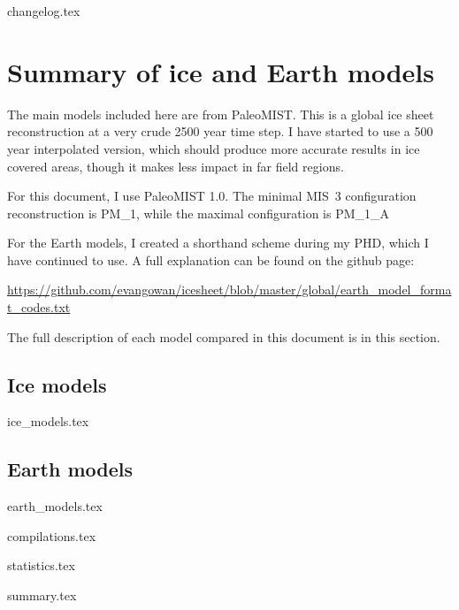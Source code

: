 \documentclass[a4paper,12pt]{article}
\begin{document}
{changelog.tex}

\section{Summary of ice and Earth models}


The main models included here are from PaleoMIST. This is a global ice sheet reconstruction at a very crude 2500 year time step. I have started to use a 500 year interpolated version, which should produce more accurate results in ice covered areas, though it makes less impact in far field regions.

For this document, I use PaleoMIST 1.0. The minimal MIS~3 configuration reconstruction is PM\_1, while the maximal configuration is PM\_1\_A

For the Earth models, I created a shorthand scheme during my PHD, which I have continued to use. A full explanation can be found on the github page:

\url{https://github.com/evangowan/icesheet/blob/master/global/earth_model_format_codes.txt}

The full description of each model compared in this document is in this section.



\subsection{Ice models}

{ice_models.tex}

\subsection{Earth models}

{earth_models.tex}

\newpage


{compilations.tex}

\newpage

{statistics.tex}


\newpage

{summary.tex}

\clearpage

\newpage



\end{document}

